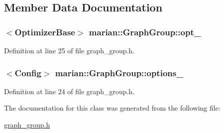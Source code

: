 \subsection{Member Data Documentation}
\subsubsection[{\texorpdfstring{opt\+\_\+}{opt_}}]{$<${\bf Optimizer\+Base}$>$ marian\+::\+Graph\+Group\+::opt\+\_\+\hspace{0.3cm}{\ttfamily [protected]}}\hypertarget{classmarian_1_1GraphGroup_acc7e9b90d489d561de842e5b64ec751a}{}\label{classmarian_1_1GraphGroup_acc7e9b90d489d561de842e5b64ec751a}


Definition at line 25 of file graph\+\_\+group.\+h.

\subsubsection[{\texorpdfstring{options\+\_\+}{options_}}]{$<${\bf Config}$>$ marian\+::\+Graph\+Group\+::options\+\_\+\hspace{0.3cm}{\ttfamily [protected]}}\hypertarget{classmarian_1_1GraphGroup_ac0b64371074b8a5654bfae72449c9064}{}\label{classmarian_1_1GraphGroup_ac0b64371074b8a5654bfae72449c9064}


Definition at line 24 of file graph\+\_\+group.\+h.



The documentation for this class was generated from the following file\+:\begin{DoxyCompactItemize}
\item 
\hyperlink{graph__group_8h}{graph\+\_\+group.\+h}\end{DoxyCompactItemize}
